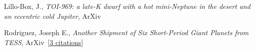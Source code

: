 \item[{\color{numcolor}\scriptsize2}] Lillo-Box, J., \emph{TOI-969: a late-K dwarf with a hot mini-Neptune in the desert and an eccentric cold Jupiter}, ArXiv\ 

\item[{\color{numcolor}\scriptsize1}] Rodriguez, Joseph E., \emph{Another Shipment of Six Short-Period Giant Planets from TESS}, ArXiv\  [\href{https://ui.adsabs.harvard.edu/abs/2022arXiv220505709R}{3 citations}]